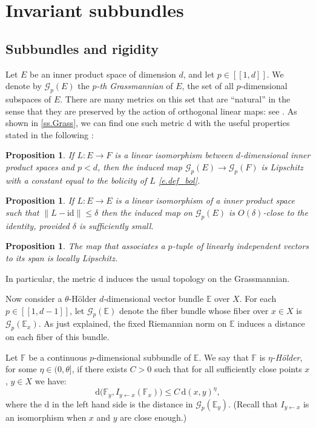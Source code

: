 \documentclass[10pt]{amsart}
\let\mathcal\mathscr
\newcommand{\ldbrack}{[\![}
\newcommand{\rdbrack}{]\!]}
\theoremstyle{plain}
\newtheorem{proposition}[theorem]{Proposition}
\theoremstyle{definition}
\newcommand{\EE}{\mathbb{E}}
\newcommand{\FF}{\mathbb{F}}
\newcommand{\id}{\mathrm{id}}
\newcommand{\cG}{\mathcal{G}}
\newcommand{\dd}{\mathrm{d}}
\newcommand{\Gr}{\mathcal{G}}
\begin{document}
\section{Invariant subbundles}\label{s.subbundles}

\subsection{Subbundles and rigidity}\label{ss.rigidity}

Let $E$ be an inner product space of dimension $d$, and let $p \in \ldbrack 1, d \rdbrack$.
We denote by $\Gr_p(E)$ the \emph{$p$-th Grassmannian} of $E$, \ie the set of all $p$-dimensional subspaces of $E$.
There are many metrics on this set that are ``natural'' in the sense that they are preserved by the action of orthogonal linear maps: see \cite{QZL}.
As shown in \cref{ss.Grass}, we can find one such metric $\dd$ with the useful properties stated in the following :

\begin{proposition}\label{p.Lip_bol}
If $L \colon E \to F$ is a linear isomorphism between $d$-dimensional inner product spaces and $p<d$,
then the induced map $\Gr_p(E) \to \Gr_p(F)$ is Lipschitz with a constant equal to the bolicity of $L$ \eqref{e.def_bol}.
\end{proposition}

\begin{proposition}\label{p.close_id}
If $L \colon E \to E$ is a linear isomorphism of a inner product space such that $\|L-\id\| \le \delta$ then the induced map on $\Gr_p(E)$ is $O(\delta)$-close to the identity, provided $\delta$ is sufficiently small.
\end{proposition}

\begin{proposition}\label{p.span_Lip}
The map that associates a $p$-tuple of linearly independent vectors to its span is locally Lipschitz.
\end{proposition}

In particular, the metric $\dd$ induces the usual topology on the Grassmannian.

Now consider a $\theta$-Hölder $d$-dimensional vector bundle $\EE$ over $X$.
For each $p \in \ldbrack 1, d-1 \rdbrack$, let $\Gr_p(\EE)$ denote the fiber bundle whose fiber over $x\in X$ is $\Gr_p(\EE_x)$.
As just explained, the fixed Riemannian norm on $\EE$ induces a distance on each fiber of this bundle.

Let $\FF$ be a continuous
$p$-dimensional subbundle of $\EE$.
We say that $\FF$ is \emph{$\eta$-Hölder}, for some $\eta \in (0,\theta]$, if
there exists $C>0$ such that for all sufficiently close points $x$, $y \in X$ we have:
\begin{equation}\label{e.Holder_subbundle}
\dd \big( \FF_y, I_{y \gets x} (\FF_x) \big) \le C \, \dd(x,y)^{\eta},
\end{equation}
where the $\dd$ in the left hand side is the distance in $\cG_p(\EE_y)$.
(Recall that $I_{y \gets x}$ is an isomorphism when $x$ and $y$ are close enough.)
\end{document}
